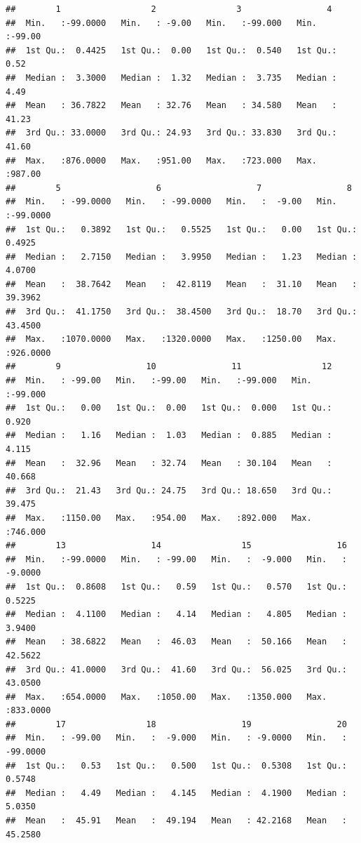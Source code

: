 \documentclass[
]{article}
\begin{document}
\begin{verbatim}
##        1                  2                3                 4         
##  Min.   :-99.0000   Min.   : -9.00   Min.   :-99.000   Min.   :-99.00  
##  1st Qu.:  0.4425   1st Qu.:  0.00   1st Qu.:  0.540   1st Qu.:  0.52  
##  Median :  3.3000   Median :  1.32   Median :  3.735   Median :  4.49  
##  Mean   : 36.7822   Mean   : 32.76   Mean   : 34.580   Mean   : 41.23  
##  3rd Qu.: 33.0000   3rd Qu.: 24.93   3rd Qu.: 33.830   3rd Qu.: 41.60  
##  Max.   :876.0000   Max.   :951.00   Max.   :723.000   Max.   :987.00  
##        5                   6                   7                 8           
##  Min.   : -99.0000   Min.   : -99.0000   Min.   :  -9.00   Min.   :-99.0000  
##  1st Qu.:   0.3892   1st Qu.:   0.5525   1st Qu.:   0.00   1st Qu.:  0.4925  
##  Median :   2.7150   Median :   3.9950   Median :   1.23   Median :  4.0700  
##  Mean   :  38.7642   Mean   :  42.8119   Mean   :  31.10   Mean   : 39.3962  
##  3rd Qu.:  41.1750   3rd Qu.:  38.4500   3rd Qu.:  18.70   3rd Qu.: 43.4500  
##  Max.   :1070.0000   Max.   :1320.0000   Max.   :1250.00   Max.   :926.0000  
##        9                 10               11                12         
##  Min.   : -99.00   Min.   :-99.00   Min.   :-99.000   Min.   :-99.000  
##  1st Qu.:   0.00   1st Qu.:  0.00   1st Qu.:  0.000   1st Qu.:  0.920  
##  Median :   1.16   Median :  1.03   Median :  0.885   Median :  4.115  
##  Mean   :  32.96   Mean   : 32.74   Mean   : 30.104   Mean   : 40.668  
##  3rd Qu.:  21.43   3rd Qu.: 24.75   3rd Qu.: 18.650   3rd Qu.: 39.475  
##  Max.   :1150.00   Max.   :954.00   Max.   :892.000   Max.   :746.000  
##        13                 14                15                 16          
##  Min.   :-99.0000   Min.   : -99.00   Min.   :  -9.000   Min.   : -9.0000  
##  1st Qu.:  0.8608   1st Qu.:   0.59   1st Qu.:   0.570   1st Qu.:  0.5225  
##  Median :  4.1100   Median :   4.14   Median :   4.805   Median :  3.9400  
##  Mean   : 38.6822   Mean   :  46.03   Mean   :  50.166   Mean   : 42.5622  
##  3rd Qu.: 41.0000   3rd Qu.:  41.60   3rd Qu.:  56.025   3rd Qu.: 43.0500  
##  Max.   :654.0000   Max.   :1050.00   Max.   :1350.000   Max.   :833.0000  
##        17                18                 19                 20           
##  Min.   : -99.00   Min.   :  -9.000   Min.   : -9.0000   Min.   : -99.0000  
##  1st Qu.:   0.53   1st Qu.:   0.500   1st Qu.:  0.5308   1st Qu.:   0.5748  
##  Median :   4.49   Median :   4.145   Median :  4.1900   Median :   5.0350  
##  Mean   :  45.91   Mean   :  49.194   Mean   : 42.2168   Mean   :  45.2580  

\end{verbatim}
\end{document}
